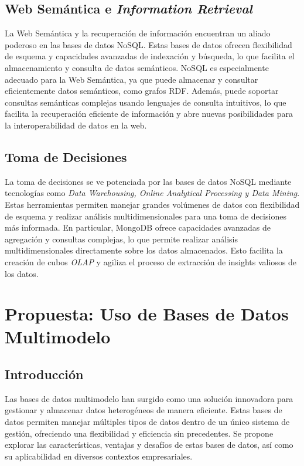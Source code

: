 \documentclass[pdflatex,sn-mathphys-num]{sn-jnl}
\theoremstyle{thmstyleone}%
\theoremstyle{thmstyletwo}%
\theoremstyle{thmstylethree}%
\begin{document}
\subsection{Web Semántica e \textit{Information Retrieval}}

La Web Semántica y la recuperación de información encuentran un aliado poderoso en las bases de datos NoSQL. Estas bases de datos ofrecen flexibilidad de esquema y capacidades avanzadas de indexación y búsqueda, lo que facilita el almacenamiento y consulta de datos semánticos. NoSQL es especialmente adecuado para la Web Semántica, ya que puede almacenar y consultar eficientemente datos semánticos, como grafos RDF. Además, puede soportar consultas semánticas complejas usando lenguajes de consulta intuitivos, lo que facilita la recuperación eficiente de información y abre nuevas posibilidades para la interoperabilidad de datos en la web.

\subsection{Toma de Decisiones}

La toma de decisiones se ve potenciada por las bases de datos NoSQL mediante tecnologías como \textit{Data Warehousing, Online Analytical Processing y Data Mining}. Estas herramientas permiten manejar grandes volúmenes de datos con flexibilidad de esquema y realizar análisis multidimensionales para una toma de decisiones más informada. En particular, MongoDB ofrece capacidades avanzadas de agregación y consultas complejas, lo que permite realizar análisis multidimensionales directamente sobre los datos almacenados. Esto facilita la creación de cubos \textit{OLAP} y agiliza el proceso de extracción de insights valiosos de los datos.

\section{Propuesta: Uso de Bases de Datos Multimodelo}\label{sec10}

\subsection{Introducción}

Las bases de datos multimodelo han surgido como una solución innovadora para gestionar y almacenar datos heterogéneos de manera eficiente. Estas bases de datos permiten manejar múltiples tipos de datos dentro de un único sistema de gestión, ofreciendo una flexibilidad y eficiencia sin precedentes. Se propone explorar las características, ventajas y desafíos de estas bases de datos, así como su aplicabilidad en diversos contextos empresariales.
\end{document}
